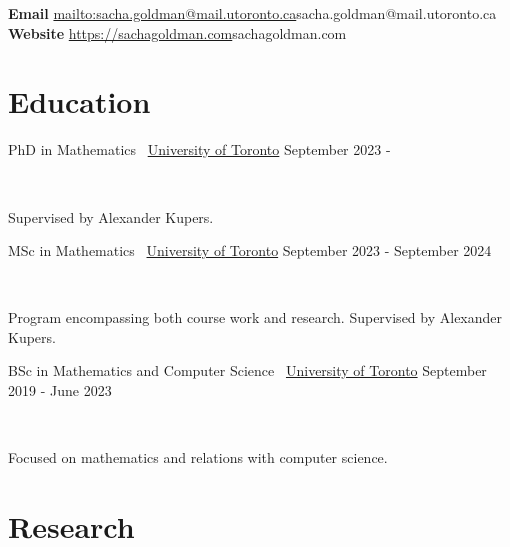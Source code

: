 \documentclass[]{style}
\begin{document}

\vspace{-5mm}
\begin{center}
	\textbf{Email}
	\url{mailto:sacha.goldman@mail.utoronto.ca}{sacha.goldman@mail.utoronto.ca} \hspace{1cm}
	\textbf{Website} 
	\url{https://sachagoldman.com}{sachagoldman.com}
\end{center}
\vspace{5mm}
 
\section{Education}

\begin{entrylist}

\vspace{1mm}

\entry
{PhD in Mathematics \ {\normalfont \underline{University of Toronto}}}
{September 2023 - }
{  ~ \vspace{-2.5mm}

Supervised by Alexander Kupers.
}

\entry
{MSc in Mathematics \ {\normalfont \underline{University of Toronto}}}
{September 2023 - September 2024}
{  ~ \vspace{-2.5mm}

Program encompassing both course work and research. Supervised by Alexander Kupers.
}

\entry
{BSc in Mathematics and Computer Science \ {\normalfont \underline{University of Toronto}}}
{September 2019 - June 2023}
{ ~ \vspace{-2.5mm}

Focused on mathematics and relations with computer science.
}

\end{entrylist}

\section{Research}
\end{document}
